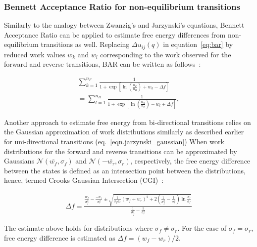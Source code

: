 \subsubsection{Bennett Acceptance Ratio for non-equilibrium transitions}
Similarly to the analogy between Zwanzig's and Jarzynski's equations, Bennett Acceptance Ratio can be applied to estimate free energy differences from non-equilibrium transitions as well.
Replacing $\Delta u_{ij}(q)$ in equation~\ref{eq:bar} by reduced work values $w_k$ and $w_l$ corresponding to the work observed for the forward and reverse transitions, BAR can be written as follows~\cite{shirts2003equilibrium}:

\begin{eqnarray}
 \sum_{k=1}^{n_F} \frac{1}{1 + \exp[\ln(\frac{n_F}{n_R}) + w_{k} - \Delta f]} \nonumber \\
 =\sum_{l=1}^{n_R} \frac{1}{1 + \exp[\ln(\frac{n_R}{n_F}) - w_{l} + \Delta f]}, \label{eq:bar_noneq}
\end{eqnarray}

Another approach to estimate free energy from bi-directional transitions relies on the Gaussian approximation of work distributions similarly as described earlier for uni-directional transitions (eq.~\ref{eqn.jarzynski_gaussian})
When work distributions for the forward and reverse transitions can be approximated by Gaussians $\mathcal{N}(\overline{w_f},\sigma_f)$ and $\mathcal{N}(-\overline{w_r},\sigma_r)$, respectively, the free energy difference between the states is defined as an intersection point between the distributions, hence, termed Crooks Gaussian Intersection (CGI)~\cite{goette2009accuracy}:

\begin{eqnarray}\label{eq:cgi_noneq}
 \Delta f = \frac{\frac{w_f}{\sigma_f^2}-\frac{-w_r}{\sigma_r^2}\pm\sqrt{\frac{1}{\sigma_f\sigma_r}(w_f+w_r)^2+2(\frac{1}{\sigma_f^2}-\frac{1}{\sigma_r^2})\ln{\frac{\sigma_r}{\sigma_f}}}}{\frac{1}{\sigma_f^2}-\frac{1}{\sigma_r^2}}
\end{eqnarray}

The estimate above holds for distributions where $\sigma_f \neq \sigma_r$.
For the case of $\sigma_f=\sigma_r$, free energy difference is estimated as $\Delta f = (w_f-w_r)/2$.


